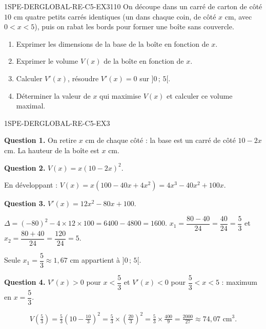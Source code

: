 \begin{exercice}{1SPE-DERGLOBAL-RE-C5-EX3}{1}{10}
On découpe dans un carré de carton de côté $10$ cm quatre petits carrés identiques (un dans chaque coin, de côté $x$ cm, avec $0 < x < 5$), puis on rabat les bords pour former une boîte sans couvercle.
\begin{enumerate}
  \item Exprimer les dimensions de la base de la boîte en fonction de $x$.
  \item Exprimer le volume $V(x)$ de la boîte en fonction de $x$.
  \item Calculer $V'(x)$, résoudre $V'(x) = 0$ sur $]0\,;\,5[$.
  \item Déterminer la valeur de $x$ qui maximise $V(x)$ et calculer ce volume maximal.
\end{enumerate}
\end{exercice}


\begin{corrige}{1SPE-DERGLOBAL-RE-C5-EX3}

\textbf{Question 1.}
On retire $x$ cm de chaque côté : la base est un carré de côté $10 - 2x$ cm. La hauteur de la boîte est $x$ cm.

\textbf{Question 2.}
$V(x) = x(10 - 2x)^2.$

En développant : $V(x) = x(100 - 40x + 4x^2) = 4x^3 - 40x^2 + 100x.$

\textbf{Question 3.}
$V'(x) = 12x^2 - 80x + 100.$


$\Delta = (-80)^2 - 4 \times 12 \times 100 = 6400 - 4800 = 1600.$
$x_1 = \dfrac{80 - 40}{24} = \dfrac{40}{24} = \dfrac{5}{3}$ et $x_2 = \dfrac{80 + 40}{24} = \dfrac{120}{24} = 5.$

Seule $x_1 = \dfrac{5}{3} \approx 1{,}67$ cm appartient à $]0\,;\,5[$.

\textbf{Question 4.}
$V'(x) > 0$ pour $x < \dfrac{5}{3}$ et $V'(x) < 0$ pour $\dfrac{5}{3} < x < 5$ : maximum en $x = \dfrac{5}{3}$.

\[
V\!\left(\tfrac{5}{3}\right) = \tfrac{5}{3}\left(10 - \tfrac{10}{3}\right)^2 = \tfrac{5}{3} \times \left(\tfrac{20}{3}\right)^2 = \tfrac{5}{3} \times \tfrac{400}{9} = \tfrac{2000}{27} \approx 74{,}07 \text{ cm}^3.
\]

\end{corrige}
